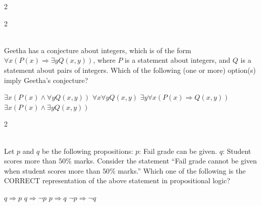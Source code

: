 \documentclass[12pt]{exam}
\begin{document}
\begin{questions}
\begin{multicols*}{2}
\end{multicols*}
\vspace{0.6cm}
\newpage
\begin{multicols*}{2}

 \\[0.2cm]
{\Large Geetha has a conjecture about integers, which is of the form $\forall x (P(x) \Rightarrow \exists y Q(x,y))$, where $P$ is a statement about integers, and $Q$ is a statement about pairs of integers. Which of the following (one or more) option(s) imply Geetha’s conjecture?}
\begin{choices}
  \choice $\exists x (P(x) \wedge \forall y Q(x,y))$
  \choice $\forall x \forall y Q(x,y)$
  \choice $\exists y \forall x (P(x) \Rightarrow Q(x,y))$
  \choice $\exists x (P(x) \wedge \exists y Q(x,y))$
\end{choices}

\end{multicols*}
\vspace{0.6cm}
\newpage
\begin{multicols*}{2}

 \\[0.2cm]
{\Large Let $p$ and $q$ be the following propositions:\newline
$p$: Fail grade can be given.\newline
$q$: Student scores more than $50\%$ marks.\newline
Consider the statement “Fail grade cannot be given when student scores more than $50\%$ marks.” Which one of the following is the CORRECT representation of the above statement in propositional logic?}
\begin{choices}
  \choice $q \Rightarrow p$
  \choice $q \Rightarrow \neg p$
  \choice $p \Rightarrow q$
  \choice $\neg p \Rightarrow \neg q$
\end{choices}

\end{multicols*}
\vspace{0.6cm}
\newpage

\end{questions}
\end{document}
